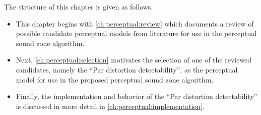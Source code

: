 The structure of this chapter is given as follows.
\begin{itemize}
    \item This chapter begins with \autoref{ch:perceptual:review} which documents a review of 
        possible candidate perceptual models from literature for use in the perceptual sound zone algorithm. 
    \item Next, \autoref{ch:perceptual:selection} motivates the selection of one of the reviewed candidates, 
        namely the ``Par distortion detectability'', as the perceptual model for use in the 
        proposed perceptual sound zone algorithm.
    \item Finally, the implementation and behavior of the ``Par distortion detectability'' is discussed in more detail in 
        \autoref{ch:perceptual:implementation}.
\end{itemize}
